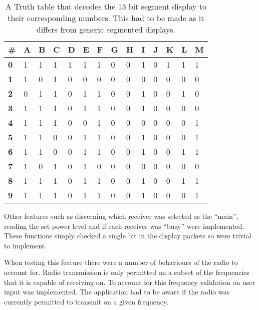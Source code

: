 \begin{table}[h!]
\vspace{0.5cm}
\centering
\begin{tabular}{l|l|l|l|l|l|l|l|l|l|l|l|l|l}
\# & \textbf{A} & \textbf{B} & \textbf{C} & \textbf{D} & \textbf{E} & \textbf{F} & \textbf{G} & \textbf{H} & \textbf{I} & \textbf{J} & \textbf{K} & \textbf{L} & \textbf{M} \\
\hline
\textbf{0} & 1 & 1 & 1 & 1 & 1 & 1 & 0 & 0 & 1 & 0 & 1 & 1 & 1 \\
\hline
\textbf{1} & 1 & 0 & 1 & 0 & 0 & 0 & 0 & 0 & 0 & 0 & 0 & 0 & 0 \\
\hline
\textbf{2} & 0 & 1 & 1 & 0 & 1 & 1 & 0 & 0 & 1 & 0 & 0 & 1 & 0 \\
\hline
\textbf{3} & 1 & 1 & 1 & 0 & 1 & 1 & 0 & 0 & 1 & 0 & 0 & 0 & 0 \\
\hline
\textbf{4} & 1 & 1 & 1 & 0 & 0 & 1 & 0 & 0 & 0 & 0 & 0 & 0 & 1 \\
\hline
\textbf{5} & 1 & 1 & 0 & 0 & 1 & 1 & 0 & 0 & 1 & 0 & 0 & 0 & 1 \\
\hline
\textbf{6} & 1 & 1 & 0 & 0 & 1 & 1 & 0 & 0 & 1 & 0 & 0 & 1 & 1 \\
\hline
\textbf{7} & 1 & 0 & 1 & 0 & 1 & 0 & 0 & 0 & 0 & 0 & 0 & 0 & 0 \\
\hline
\textbf{8} & 1 & 1 & 1 & 0 & 1 & 1 & 0 & 0 & 1 & 0 & 0 & 1 & 1 \\
\hline
\textbf{9} & 1 & 1 & 1 & 0 & 1 & 1 & 0 & 0 & 1 & 0 & 0 & 0 & 1
\end{tabular}
\label{13_segment_truth}
\caption[13 Segment Truth table]{A Truth table that decodes the 13 bit segment display to their corresponding numbers. This had to be made as it differs from generic segmented displays.}
\vspace{0.5cm}
\end{table}

Other features such as discerning which receiver was selected as the ``main'', reading the set power level and if each receiver was ``busy'' were implemented. These functions simply checked a single bit in the display packets so were trivial to implement.

When testing this feature there were a number of behaviours of the radio to account for. Radio transmission is only permitted on a subset of the frequencies that it is capable of receiving on. To account for this frequency validation on user input was implemented. The application had to be aware if the radio was currently permitted to transmit on a given frequency. 

